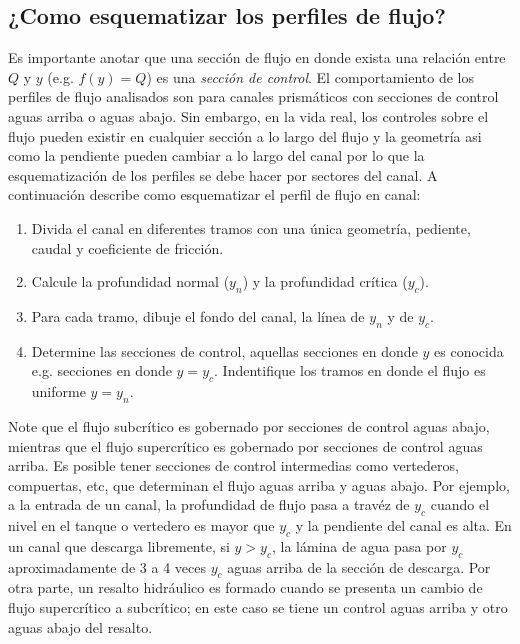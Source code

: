 \documentclass[11pt, oneside]{article}
\begin{document}
\subsection{¿Como esquematizar los perfiles de flujo?}
Es importante anotar que una secci\'on de flujo en donde exista una relaci\'on entre $Q$ y $y$ (e.g. $f(y)=Q$) es una \emph{secci\'on de control}. El comportamiento de los perfiles de flujo analisados son para canales prism\'aticos con secciones de control aguas arriba o aguas abajo. Sin embargo, en la vida real, los controles sobre el flujo pueden existir en cualquier secci\'on a lo largo del flujo y la geometr\'ia asi como la pendiente pueden cambiar a lo largo del canal por lo que la esquematizaci\'on de los perfiles se debe hacer por sectores del canal. A continuaci\'on describe como esquematizar el perfil de flujo en canal:
\begin{enumerate}
    \item Divida el canal en diferentes tramos con una \'unica geometr\'ia, pediente, caudal y coeficiente de fricci\'on.
    \item Calcule la profundidad normal ($y_n$) y la profundidad cr\'itica ($y_c$).
    \item Para cada tramo, dibuje el fondo del canal, la l\'inea de $y_n$ y de $y_c$.
    \item Determine las secciones de control, aquellas secciones en donde $y$ es conocida e.g. secciones en donde $y = y_c$. Indentifique los tramos en donde el flujo es uniforme $y = y_n$.
\end{enumerate}
Note que el flujo subcr\'itico es gobernado por  secciones de control aguas abajo, mientras que el flujo supercr\'itico es gobernado por secciones de control aguas arriba. Es posible tener secciones de control intermedias como vertederos, compuertas, etc, que determinan el flujo aguas arriba y aguas abajo. Por ejemplo, a la entrada de un canal, la profundidad de flujo pasa a trav\'ez de $y_c$ cuando el nivel en el tanque o vertedero es mayor que $y_c$ y la pendiente del canal es alta. En un canal que descarga libremente, si $y > y_c$, la l\'amina de agua pasa por $y_c$ aproximadamente de 3 a 4 veces $y_c$ aguas arriba de la secci\'on de descarga. Por otra parte, un resalto hidr\'aulico es formado cuando se presenta un cambio de flujo supercr\'itico a subcr\'itico; en este caso se tiene un control aguas arriba y otro aguas abajo del resalto.
\end{document}
